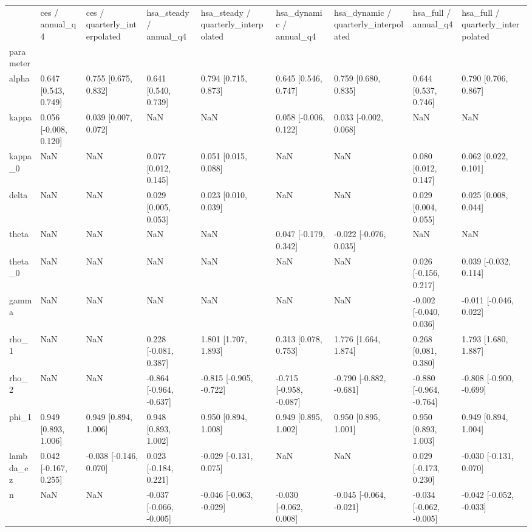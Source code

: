 \begin{tabular}{lllllllll}
\toprule
 & ces / annual\_q4 & ces / quarterly\_interpolated & hsa\_steady / annual\_q4 & hsa\_steady / quarterly\_interpolated & hsa\_dynamic / annual\_q4 & hsa\_dynamic / quarterly\_interpolated & hsa\_full / annual\_q4 & hsa\_full / quarterly\_interpolated \\
parameter &  &  &  &  &  &  &  &  \\
\midrule
alpha & 0.647 [0.543, 0.749] & 0.755 [0.675, 0.832] & 0.641 [0.540, 0.739] & 0.794 [0.715, 0.873] & 0.645 [0.546, 0.747] & 0.759 [0.680, 0.835] & 0.644 [0.537, 0.746] & 0.790 [0.706, 0.867] \\
kappa & 0.056 [-0.008, 0.120] & 0.039 [0.007, 0.072] & NaN & NaN & 0.058 [-0.006, 0.122] & 0.033 [-0.002, 0.068] & NaN & NaN \\
kappa\_0 & NaN & NaN & 0.077 [0.012, 0.145] & 0.051 [0.015, 0.088] & NaN & NaN & 0.080 [0.012, 0.147] & 0.062 [0.022, 0.101] \\
delta & NaN & NaN & 0.029 [0.005, 0.053] & 0.023 [0.010, 0.039] & NaN & NaN & 0.029 [0.004, 0.055] & 0.025 [0.008, 0.044] \\
theta & NaN & NaN & NaN & NaN & 0.047 [-0.179, 0.342] & -0.022 [-0.076, 0.035] & NaN & NaN \\
theta\_0 & NaN & NaN & NaN & NaN & NaN & NaN & 0.026 [-0.156, 0.217] & 0.039 [-0.032, 0.114] \\
gamma & NaN & NaN & NaN & NaN & NaN & NaN & -0.002 [-0.040, 0.036] & -0.011 [-0.046, 0.022] \\
rho\_1 & NaN & NaN & 0.228 [-0.081, 0.387] & 1.801 [1.707, 1.893] & 0.313 [0.078, 0.753] & 1.776 [1.664, 1.874] & 0.268 [0.081, 0.380] & 1.793 [1.680, 1.887] \\
rho\_2 & NaN & NaN & -0.864 [-0.964, -0.637] & -0.815 [-0.905, -0.722] & -0.715 [-0.958, -0.087] & -0.790 [-0.882, -0.681] & -0.880 [-0.964, -0.764] & -0.808 [-0.900, -0.699] \\
phi\_1 & 0.949 [0.893, 1.006] & 0.949 [0.894, 1.006] & 0.948 [0.893, 1.002] & 0.950 [0.894, 1.008] & 0.949 [0.895, 1.002] & 0.950 [0.895, 1.001] & 0.950 [0.893, 1.003] & 0.949 [0.894, 1.004] \\
lambda\_ez & 0.042 [-0.167, 0.255] & -0.038 [-0.146, 0.070] & 0.023 [-0.184, 0.221] & -0.029 [-0.131, 0.075] & NaN & NaN & 0.029 [-0.173, 0.230] & -0.030 [-0.131, 0.070] \\
n & NaN & NaN & -0.037 [-0.066, -0.005] & -0.046 [-0.063, -0.029] & -0.030 [-0.062, 0.008] & -0.045 [-0.064, -0.021] & -0.034 [-0.062, -0.005] & -0.042 [-0.052, -0.033] \\
\bottomrule
\end{tabular}
